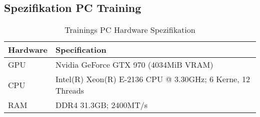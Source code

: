 \documentclass[11pt]{scrartcl}
\begin{document}
\subsection{Spezifikation PC Training}
\label{sec:specs}
\begin{table}[ht]
  \begin{center}
    \begin{tabular}{l | l}
      \textbf{Hardware} & \textbf{Specification} \\
      \hline
      GPU & Nvidia GeForce GTX 970 (4034MiB VRAM)\\
      CPU & Intel(R) Xeon(R) E-2136 CPU @ 3.30GHz; 6 Kerne, 12 Threads\\
      RAM & DDR4 31.3GB; 2400MT/s
    \end{tabular}

    \caption[PC Specifikation]{Trainings PC Hardware Spezifikation}
    \label{tab:pc_specs}
  \end{center}
\end{table}
\end{document}
